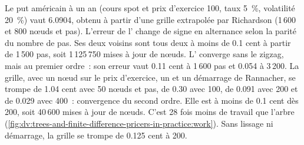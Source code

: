 \begin{example}\label{ex:dv:trees-and-finite-difference-pricers-in-practice:budget}
Le put américain à un an (cours spot et prix d'exercice 100, taux 5~\%, volatilité 20~\%) vaut 6.0904, obtenu à partir d'une grille extrapolée par Richardson (1\,600 et 800 nœuds
et pas). L'erreur de l' change de signe en alternance selon la parité du nombre de pas. Ses deux voisins sont tous deux à moins de 0.1 cent
à partir de 1\,500 pas, soit 1\,125\,750 mises à jour de nœuds. L' converge sans le zigzag, mais au premier ordre~: son erreur vaut 0.11 cent à 1\,600 pas
et 0.054 à 3\,200. La grille, avec un nœud sur le prix d'exercice, un  et un démarrage de Rannacher, se trompe de 1.04 cent avec 50 nœuds et pas, de 0.30 avec
100, de 0.091 avec 200 et de 0.029 avec 400~: convergence du second ordre. Elle est à moins de 0.1 cent dès 200, soit 40\,600 mises à jour de nœuds. C'est 28 fois moins de travail que l'arbre
(\cref{fig:dv:trees-and-finite-difference-pricers-in-practice:work}). Sans lissage ni démarrage, la grille se trompe de 0.125 cent à 200.
\end{example}

